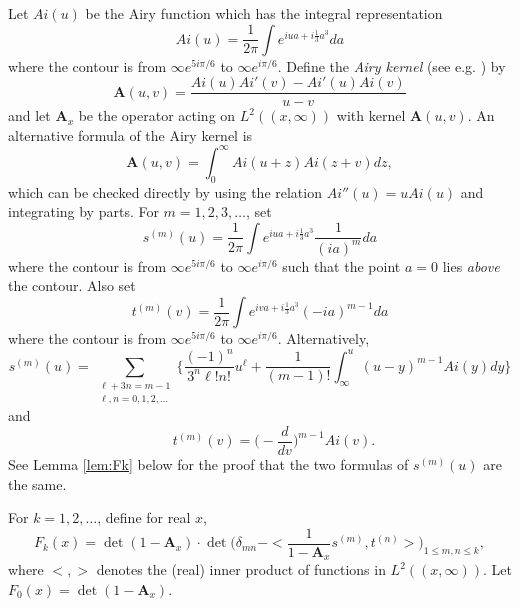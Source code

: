 \documentclass[11pt]{article}
\begin{document}
Let $Ai(u)$ be the Airy function which has the integral
representation
\begin{equation}\label{eq:Airyintrep}
  Ai(u) = \frac{1}{2\pi } \int e^{iua+i\frac{1}3 a^{3}}da
\end{equation}
where the contour is from $\infty e^{5i\pi/6}$ to $\infty
e^{i\pi/6}$. Define the \emph{Airy kernel} (see e.g.
\cite{TracyWidom}) by
\begin{equation}
  \mathbf{A}(u,v) = \frac{Ai(u)Ai'(v)-Ai'(u)Ai(v)}{u-v}
\end{equation}
and let $\mathbf{A}_x$ be the operator acting on $L^2((x,\infty))$
with kernel $\mathbf{A}(u,v)$. An alternative formula of the Airy
kernel is
\begin{equation}\label{eq:Airykernelint}
  \mathbf{A}(u,v) = \int_0^\infty Ai(u+z)Ai(z+v) dz,
\end{equation}
which can be checked directly by using the relation
$Ai''(u)=uAi(u)$ and integrating by parts. For $m=1,2,3,\dots$,
set
\begin{equation}\label{eq:sdef}
  s^{(m)}(u) = \frac{1}{2\pi }\int e^{iua+ i\frac13a^3} \frac1{(ia)^m} da
\end{equation}
where the contour is from $\infty e^{5i\pi/6}$ to $\infty
e^{i\pi/6}$ such that the point $a=0$ lies \emph{above} the
contour. Also set
\begin{equation}
  t^{(m)}(v) = \frac{1}{2\pi } \int e^{iva+ i\frac13 a^3} (-ia)^{m-1}
  da
\end{equation}
where the contour is from $\infty e^{5i\pi/6}$ to $\infty
e^{i\pi/6}$. Alternatively,
\begin{equation}
  s^{(m)}(u) =  \sum_{\substack{\ell+3n = m-1\\ \ell, n = 0,1,2,\dots}} \biggl\{ \frac{(-1)^n}{3^n \ell ! n!}
  u^\ell + \frac1{(m-1)!} \int_\infty^u (u-y)^{m-1} Ai(y)dy
  \biggr\}
\end{equation}
and
\begin{equation}
  \qquad t^{(m)}(v) = \biggl( -\frac{d}{dv} \biggr)^{m-1} Ai(v).
\end{equation}
See Lemma \ref{lem:Fk} below for the proof that the two formulas of $s^{(m)}(u)$
are the same.

\begin{definition}\label{def:Fk}
For $k=1,2,\dots$, define for real $x$,
\begin{equation}\label{eq:Fkdef}
  F_k(x) = \det (1-\mathbf{A}_x) \cdot
  \det \biggl( \delta_{mn} - < \frac{1}{1-\mathbf{A}_x}
  s^{(m)}, t^{(n)} > \biggr)_{1\le m,n\le k},
\end{equation}
where $<,>$ denotes the (real) inner product of functions in
$L^2((x,\infty))$. Let $F_0(x)=\det(1-\mathbf{A}_x)$.
\end{definition}
\end{document}
